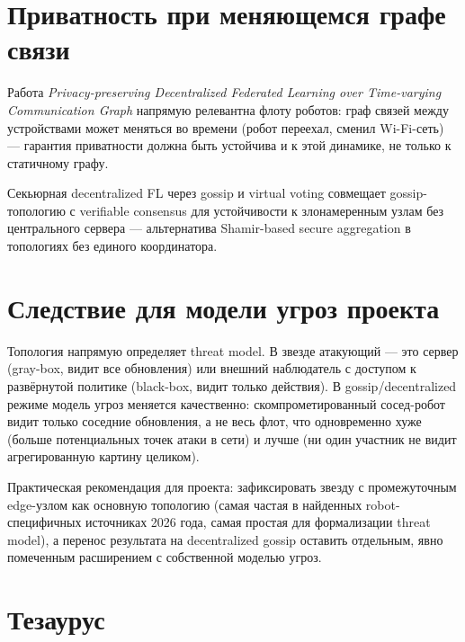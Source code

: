 \documentclass[11pt]{article}
\begin{document}
\section{Приватность при меняющемся графе связи}

Работа \emph{Privacy-preserving Decentralized Federated Learning over Time-varying
Communication Graph} \cite{timevarying2022} напрямую релевантна флоту роботов: граф
связей между устройствами может меняться во времени (робот переехал, сменил
Wi-Fi-сеть) — гарантия приватности должна быть устойчива и к этой динамике, не
только к статичному графу.

Секьюрная decentralized FL через gossip и virtual voting \cite{gossipvoting2026}
совмещает gossip-топологию с verifiable consensus для устойчивости к
злонамеренным узлам без центрального сервера — альтернатива Shamir-based secure
aggregation в топологиях без единого координатора.

\section{Следствие для модели угроз проекта}

Топология напрямую определяет threat model. В звезде атакующий — это сервер
(gray-box, видит все обновления) или внешний наблюдатель с доступом к развёрнутой
политике (black-box, видит только действия). В gossip/decentralized режиме модель
угроз меняется качественно: скомпрометированный сосед-робот видит только соседние
обновления, а не весь флот, что одновременно хуже (больше потенциальных точек атаки
в сети) и лучше (ни один участник не видит агрегированную картину целиком).

Практическая рекомендация для проекта: зафиксировать звезду с промежуточным
edge-узлом как основную топологию (самая частая в найденных robot-специфичных
источниках 2026 года, самая простая для формализации threat model), а перенос
результата на decentralized gossip оставить отдельным, явно помеченным
расширением с собственной моделью угроз.

\section{Тезаурус}
\end{document}

